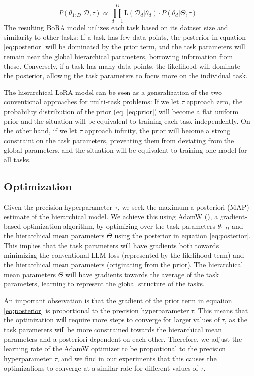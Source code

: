 \documentclass[fullpaper]{nldl}
\begin{document}
\begin{equation} \label{eq:posterior}
    P(\theta_{1:D} | \mathcal{D}, \tau) \propto \prod_{d=1}^D \text{L}(\mathcal{D}_d | \theta_d) \cdot P(\theta_d | \Theta, \tau)
\end{equation}
%
The resulting BoRA model utilizes each task based on its dataset size and similarity to other tasks: If a task has few data points, the posterior in equation \ref{eq:posterior} will be dominated by the prior term, and the task parameters will remain near the global hierarchical parameters, borrowing information from these. Conversely, if a task has many data points, the likelihood will dominate the posterior, allowing the task parameters to focus more on the individual task.

The hierarchical LoRA model can be seen as a generalization of the two conventional approaches for multi-task problems: If we let $\tau$ approach zero, the probability distribution of the prior (eq. \ref{eq:prior}) will become a flat uniform prior and the situation will be equivalent to training each task independently. On the other hand, if we let $\tau$ approach infinity, the prior will become a strong constraint on the task parameters, preventing them from deviating from the global parameters, and the situation will be equivalent to training one model for all tasks.

\subsection{Optimization}
Given the precision hyperparameter $\tau$, we seek the maximum a posteriori (MAP) estimate of the hierarchical model. We achieve this using AdamW (\cite{adamW}), a gradient-based optimization algorithm, by optimizing over the task parameters $\theta_{1:D}$ and the hierarchical mean parameters $\Theta$ using the posterior in equation \ref{eq:posterior}. This implies that the task parameters will have gradients both towards minimizing the conventional LLM loss (represented by the likelihood term) and the hierarchical mean parameters (originating from the prior). The hierarchical mean parameters $\Theta$ will have gradients towards the average of the task parameters, learning to represent the global structure of the tasks.

An important observation is that the gradient of the prior term in equation \ref{eq:posterior} is proportional to the precision hyperparameter $\tau$. This means that the optimization will require more steps to converge for larger values of $\tau$, as the task parameters will be more constrained towards the hierarchical mean parameters and a posteriori dependent on each other. Therefore, we adjust the learning rate of the AdamW optimizer to be proportional to the precision hyperparameter $\tau$, and we find in our experiments that this causes the optimizations to converge at a similar rate for different values of $\tau$.
\end{document}
